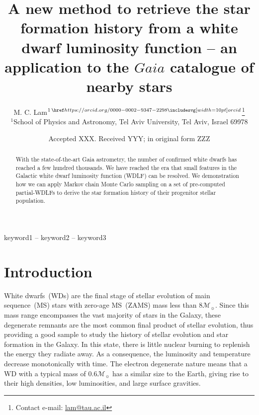 \documentclass[fleqn,usenatbib]{mnras}
\title[Galactic SFH from Gaia GCNS WDLF]{A new method to retrieve the star formation history from a white dwarf luminosity function -- an application to the $Gaia$ catalogue of nearby stars}
\author[M. C. Lam et al.]{
M. C. Lam$^{1\,\orcid{0000-0002-9347-2298}}$\thanks{Contact e-mail: \href{mailto:lam@tau.ac.il}{lam@tau.ac.il}}
\\
$^{1}$School of Physics and Astronomy, Tel Aviv University, Tel Aviv, Israel 69978
}
\date{Accepted XXX. Received YYY; in original form ZZZ}
\newcommand{\msun}{\mathcal{M}_{\sun}}
\begin{document}
\label{firstpage}
\pagerange{\pageref{firstpage}--\pageref{lastpage}}
\maketitle

\begin{abstract}
With the state-of-the-art Gaia astrometry, the number of confirmed white dwarfs
has reached a few hundred thousands. We have reached the era that small features
in the Galactic white dwarf luminosity function (WDLF) can be resolved. We
demonstration how we can apply Markov chain Monte Carlo sampling on a set of
pre-computed partial-WDLFs to derive the star formation history of their progenitor
stellar population.

\end{abstract}

\begin{keywords}
keyword1 -- keyword2 -- keyword3
\end{keywords}



\section{Introduction}
White dwarfs~(WDs) are the final stage of stellar evolution of main
sequence~(MS) stars with zero-age MS~(ZAMS) mass less than $8\msun$. Since this
mass range encompasses the vast majority of stars in the Galaxy, these
degenerate remnants are the most common final product of stellar evolution,
thus providing a good sample to study the history of stellar evolution and star
formation in the Galaxy. In this state, there is little nuclear burning to
replenish the energy they radiate away. As a consequence, the luminosity and
temperature decrease monotonically with time. The electron degenerate nature
means that a WD with a typical mass of $0.6\mathcal{M}_{\sun}$ has a similar
size to the Earth, giving rise to their high densities, low luminosities, and
large surface gravities.
\end{document}
